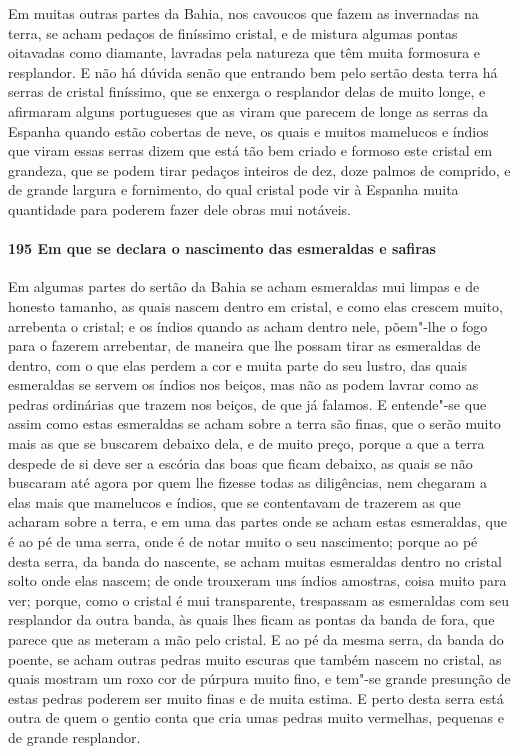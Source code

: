 Em muitas outras partes da Bahia, nos cavoucos que fazem as invernadas na terra, se acham
pedaços de finíssimo cristal, e de mistura algumas pontas oitavadas como diamante,
lavradas pela natureza que têm muita formosura e resplandor. E não há dúvida senão que
entrando bem pelo sertão desta terra há serras de cristal finíssimo, que se enxerga o
resplandor delas de muito longe, e afirmaram alguns portugueses que as viram que parecem
de longe as serras da Espanha quando estão cobertas de neve, os quais e muitos mamelucos e
índios que viram essas serras dizem que está tão bem criado e formoso este cristal em
grandeza, que se podem tirar pedaços inteiros de dez, doze palmos de comprido, e de grande
largura e fornimento, do qual cristal pode vir à Espanha muita quantidade para poderem
fazer dele obras mui notáveis.

\paragraph{195 Em que se declara o nascimento das esmeraldas e safiras}

Em algumas partes do sertão da Bahia se acham esmeraldas mui limpas e de honesto tamanho,
as quais nascem dentro em cristal, e como elas crescem muito, arrebenta o cristal; e os
índios quando as acham dentro nele, põem"-lhe o fogo para o fazerem arrebentar, de maneira
que lhe possam tirar as esmeraldas de dentro, com o que elas perdem a cor e muita parte do
seu lustro, das quais esmeraldas se servem os índios nos beiços, mas não as podem lavrar
como as pedras ordinárias que trazem nos beiços, de que já falamos. E entende"-se que assim
como estas esmeraldas se acham sobre a terra são finas, que o serão muito mais as que se
buscarem debaixo dela, e de muito preço, porque a que a terra despede de si deve ser a
escória das boas que ficam debaixo, as quais se não buscaram até agora por quem lhe
fizesse todas as diligências, nem chegaram a elas mais que mamelucos e índios, que se
contentavam de trazerem as que acharam sobre a terra, e em uma das partes onde se acham
estas esmeraldas, que é ao pé de uma serra, onde é de notar muito o seu nascimento; porque
ao pé desta serra, da banda do nascente, se acham muitas esmeraldas dentro no cristal
solto onde elas nascem; de onde trouxeram uns índios amostras, coisa muito para ver;
porque, como o cristal é mui transparente, trespassam as esmeraldas com seu resplandor da
outra banda, às quais lhes ficam as pontas da banda de fora, que parece que as meteram a
mão pelo cristal. E ao pé da mesma serra, da banda do poente, se acham outras pedras muito
escuras que também nascem no cristal, as quais mostram um roxo cor de púrpura muito fino,
e tem"-se grande presunção de estas pedras poderem ser muito finas e de muita estima. E
perto desta serra está outra de quem o gentio conta que cria umas pedras muito vermelhas,
pequenas e de grande resplandor.

